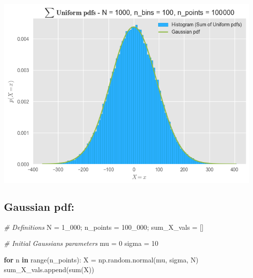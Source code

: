 \documentclass[
]{article}
\newenvironment{Shaded}{}{}
\newcommand{\BuiltInTok}[1]{\textcolor[rgb]{0.00,0.50,0.00}{#1}}
\newcommand{\CommentTok}[1]{\textcolor[rgb]{0.38,0.63,0.69}{\textit{#1}}}
\newcommand{\ControlFlowTok}[1]{\textcolor[rgb]{0.00,0.44,0.13}{\textbf{#1}}}
\newcommand{\DecValTok}[1]{\textcolor[rgb]{0.25,0.63,0.44}{#1}}
\newcommand{\KeywordTok}[1]{\textcolor[rgb]{0.00,0.44,0.13}{\textbf{#1}}}
\newcommand{\NormalTok}[1]{#1}
\newcommand{\OperatorTok}[1]{\textcolor[rgb]{0.40,0.40,0.40}{#1}}
\begin{document}
\includegraphics{vertopal_6d63c4420d4a47a4b64ec714b34abd06/014ec8a66ea44788e4837928af2d0d1e3b802589.png}

\hypertarget{gaussian-pdf}{%
\subsection{Gaussian pdf:}\label{gaussian-pdf}}

\begin{Shaded}
\begin{Highlighting}[]
\CommentTok{\# Definitions}
\NormalTok{N }\OperatorTok{=} \DecValTok{1\_000}\OperatorTok{;}\NormalTok{ n\_points }\OperatorTok{=} \DecValTok{100\_000}\OperatorTok{;}\NormalTok{ sum\_X\_vals }\OperatorTok{=}\NormalTok{ []}

\CommentTok{\# Initial Gaussian\textquotesingle{}s parameters}
\NormalTok{mu    }\OperatorTok{=} \DecValTok{0}
\NormalTok{sigma }\OperatorTok{=} \DecValTok{10}

\ControlFlowTok{for}\NormalTok{ n }\KeywordTok{in} \BuiltInTok{range}\NormalTok{(n\_points):}
\NormalTok{    X }\OperatorTok{=}\NormalTok{ np.random.normal(mu, sigma, N)}
\NormalTok{    sum\_X\_vals.append(}\BuiltInTok{sum}\NormalTok{(X))}
\end{Highlighting}
\end{Shaded}
\end{document}

